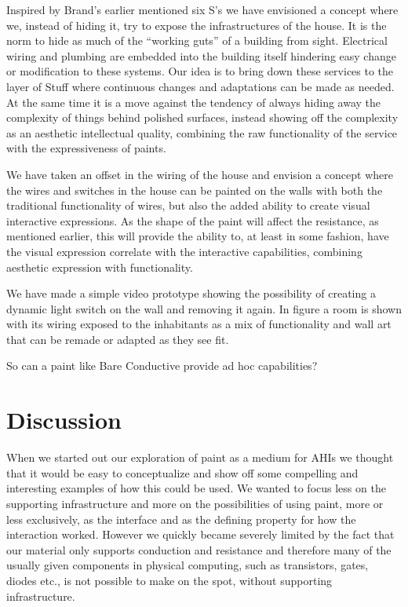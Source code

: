 Inspired by Brand's earlier mentioned six S's \citep{brand1995buildings} we have envisioned a concept where we, instead of hiding it, try to expose the infrastructures of the house.
It is the norm to hide as much of the ``working guts'' of a building from sight.
Electrical wiring and plumbing are embedded into the building itself hindering easy change or modification to these systems.
Our idea is to bring down these services to the layer of Stuff where continuous changes and adaptations can be made as needed.
At the same time it is a move against the tendency of always hiding away the complexity of things behind polished surfaces, instead showing off the complexity as an aesthetic intellectual quality, combining the raw functionality of the service with the expressiveness of paints.

We have taken an offset in the wiring of the house and envision a concept where the wires and switches in the house can be painted on the walls with both the traditional functionality of wires, but also the added ability to create visual interactive expressions.
As the shape of the paint will affect the resistance, as mentioned earlier, this will provide the ability to, at least in some fashion, have the visual expression correlate with the interactive capabilities, combining aesthetic expression with functionality.

We have made a simple video prototype showing the possibility of creating a dynamic light switch on the wall and removing it again.
In figure  a room is shown with its wiring exposed to the inhabitants as a mix of functionality and wall art that can be remade or adapted as they see fit.

So can a paint like Bare Conductive provide ad hoc capabilities?

\section{Discussion}
When we started out our exploration of paint as a medium for AHIs we thought that it would be easy to conceptualize and show off some compelling and interesting examples of how this could be used.
We wanted to focus less on the supporting infrastructure and more on the possibilities of using paint, more or less exclusively, as the interface and as the defining property for how the interaction worked. 
However we quickly became severely limited by the fact that our material only supports conduction and resistance and therefore many of the usually given components in physical computing, such as transistors, gates, diodes etc., is not possible to make on the spot, without supporting infrastructure.  


